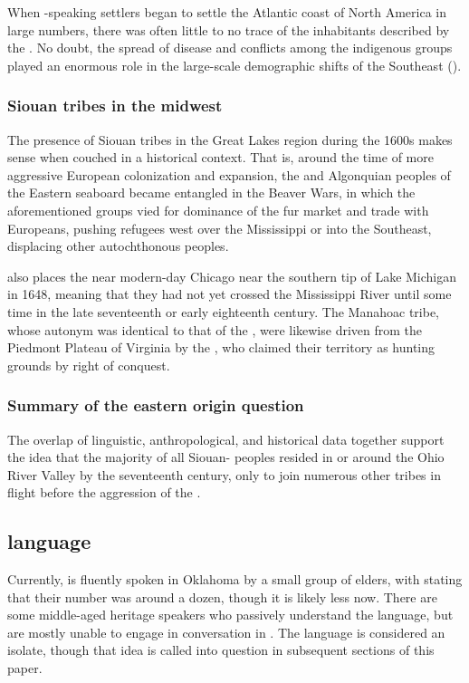 \documentclass[output=paper]{LSP/langsci}
\begin{document}
When -speaking settlers began to settle the Atlantic coast of North America in large numbers, there was often little to no trace of the inhabitants described by the . No doubt, the spread of disease and conflicts among the indigenous groups played an enormous role in the large-scale demographic shifts of the Southeast (\citealt{Mann2006}). 

\subsubsection{Siouan tribes in the midwest}

The presence of Siouan tribes in the Great Lakes region during the 1600s makes sense when couched in a historical context. That is, around the time of more aggressive European colonization and expansion, the  and Al\-gon\-qui\-an peoples of the Eastern seaboard became entangled in the Beaver Wars, in which the aforementioned groups vied for dominance of the fur market and trade with Europeans, pushing refugees west over the Mississippi or into the Southeast, displacing other autochthonous peoples. 

\citet{Jennings1990} also places the  near modern-day Chicago near the southern tip of Lake Michigan in 1648, meaning that they had not yet crossed the Mississippi River until some time in the late seventeenth or early eighteenth century. The Manahoac tribe, whose autonym was identical to that of the , were likewise driven from the Piedmont Plateau of Virginia by the , who claimed their territory as hunting grounds by right of conquest.

\subsubsection{Summary of the eastern origin question} 

The overlap of linguistic, anthropological, and historical data together support the idea that the majority of all Siouan- peoples resided in or around the Ohio River Valley by the seventeenth century, only to join numerous other tribes in flight before the aggression of the .

\subsection{ language}

Currently,  is fluently spoken in Oklahoma by a small group of elders, with \citet{Linn2000} stating that their number was around a dozen, though it is likely less now. There are some middle-aged heritage speakers who passively understand the language, but are mostly unable to engage in conversation in . The language is considered an isolate, though that idea is called into question in subsequent sections of this paper.
\end{document}
